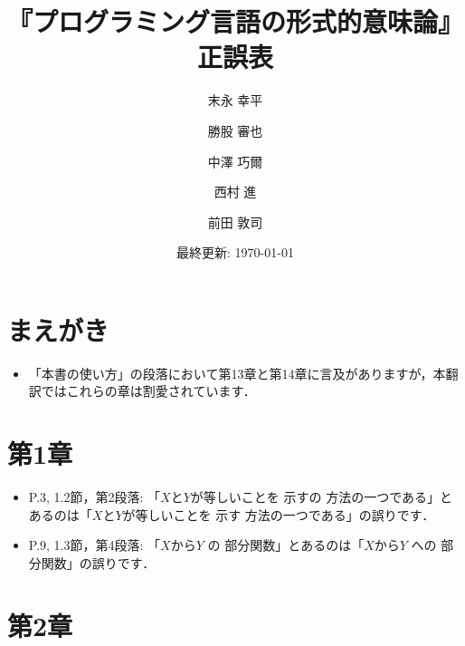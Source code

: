 \documentclass[12pt,titlepage,twoside,openright,dvipdfmx]{jsbook}
\title{『プログラミング言語の形式的意味論』正誤表}
\author{末永 幸平 \and 勝股 審也 \and 中澤 巧爾 \and 西村 進 \and 前田 敦司}
\date{最終更新: \today}
\newcommand\old[1]{%
  \textcolor[rgb]{1.0,0.25,0.1}{#1}%
  }
\newcommand\new[1]{%
  \textcolor[rgb]{0,0.55,1.0}{#1}%
  }
\theoremstyle{definition}
\begin{document}
\maketitle

\section*{まえがき}

\begin{itemize}
\item 「本書の使い方」の段落において第13章と第14章に言及がありますが，本翻訳ではこれらの章は割愛されています．
\end{itemize}

\section*{第1章}

\begin{itemize}
\item P.3, 1.2節，第2段落: 「$X$と$Y$が等しいことを\old{示すの}方法の一つである」とあるのは「$X$と$Y$が等しいことを\new{示す}方法の一つである」の誤りです．
\item P.9, 1.3節，第4段落: 「$X$から$Y$\old{の}部分関数」とあるのは「$X$から$Y$\new{への}部分関数」の誤りです．
\end{itemize}

\section*{第2章}
\end{document}
